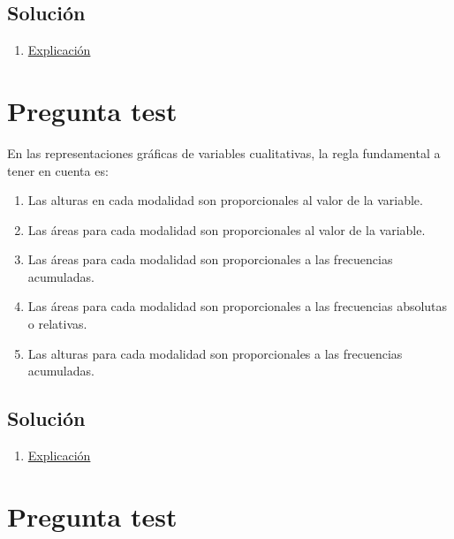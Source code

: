 \documentclass[
]{book}
\providecommand{\tightlist}{%
  \setlength{\itemsep}{0pt}\setlength{\parskip}{0pt}}
\begin{document}
\hypertarget{soluciuxf3n-19}{%
\subsection{Solución}\label{soluciuxf3n-19}}

\begin{enumerate}
\def\labelenumi{\alph{enumi})}
\setcounter{enumi}{4}
\tightlist
\item
  \href{https://1fjmanzano.github.io/bioestadistica/otros-gra\%CC\%81ficos.html}{Explicación}
\end{enumerate}

\hypertarget{pregunta-test-20}{%
\section{Pregunta test}\label{pregunta-test-20}}

En las representaciones gráficas de variables cualitativas, la regla fundamental a tener en cuenta es:

\begin{enumerate}
\def\labelenumi{\alph{enumi})}
\tightlist
\item
  Las alturas en cada modalidad son proporcionales al valor de la variable.
\item
  Las áreas para cada modalidad son proporcionales al valor de la variable.
\item
  Las áreas para cada modalidad son proporcionales a las frecuencias acumuladas.
\item
  Las áreas para cada modalidad son proporcionales a las frecuencias absolutas o relativas.
\item
  Las alturas para cada modalidad son proporcionales a las frecuencias acumuladas.
\end{enumerate}

\hypertarget{soluciuxf3n-20}{%
\subsection{Solución}\label{soluciuxf3n-20}}

\begin{enumerate}
\def\labelenumi{\alph{enumi})}
\setcounter{enumi}{3}
\tightlist
\item
  \href{https://1fjmanzano.github.io/bioestadistica/diagramas-de-barras-y-sectores.html}{Explicación}
\end{enumerate}

\hypertarget{pregunta-test-21}{%
\section{Pregunta test}\label{pregunta-test-21}}
\end{document}
